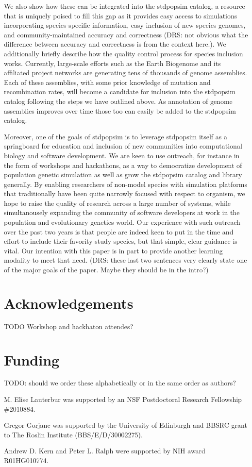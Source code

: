 \documentclass[hidelinks]{article}
\begin{document}
We also show how these can be integrated into the stdpopsim catalog, a
resource that is uniquely poised to fill this gap as it provides easy
access to simulations incorporating species-specific information,
easy inclusion of new species genomes, and community-maintained accuracy
and correctness (DRS: not obvious what the difference between accuracy
and correctness is from the context here.).
We additionally briefly describe how the quality control 
process for species inclusion works. Currently, large-scale efforts such as the Earth Biogenome
and its affiliated project networks are generating tens of thousands of genome
assemblies. Each of these assemblies, with some prior knowledge of mutation and
recombination rates, will become a candidate for inclusion into the
stdpopsim catalog following the steps we have outlined above. As
annotation of genome assemblies improves over time those too can easily
be added to the stdpopsim catalog.

Moreover, one of the goals of stdpopsim is to leverage stdpopsim itself
as a springboard for education and inclusion of new communities into
computational biology and software development. We are keen to use
outreach, for instance in the form of workshops and hackathons, as a way
to democratize development of population genetic simulation as well as
grow the stdpopsim catalog and library generally. By enabling
researchers of non-model species with simulation platforms that
traditionally have been quite narrowly focused with respect to organism,
we hope to raise the quality of research across a large number of
systems, while simultanousely expanding the community of software
developers at work in the population and evolutionary genetics world.
Our experience with such outreach over the past two years is that people
are indeed keen to put in the time and effort to include their favority
study species, but that simple, clear guidance is vital. Our
intention with this paper is in part to provide another learning
modality to meet that need. (DRS: these last two sentences very
clearly state one of the major goals of the paper. Maybe they should be
in the intro?)

\hypertarget{acknowledgements}{%
\section*{Acknowledgements}\label{acknowledgements}}

TODO Workshop and hackhaton attendes?

\hypertarget{funding}{%
\section*{Funding}\label{funding}}

TODO: should we order these alphabetically or in the same order as authors?

M. Elise Lauterbur was supported by an NSF Postdoctoral Research Fellowship \#2010884.

Gregor Gorjanc was supported by the University of Edinburgh and BBSRC grant to The Roslin Institute (BBS/E/D/30002275).

Andrew D. Kern and Peter L. Ralph were supported by NIH award R01HG010774.


\end{document}
